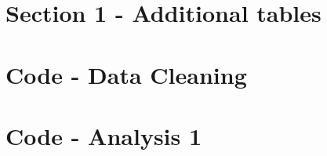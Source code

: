 \documentclass[hidelinks,12pts]{article}
\DeclareMathOperator{\1}{\mathbbm{1}}
\begin{document}
\newpage
\newpage
\begin{appendices}

    \section{Section 1 - Additional tables} \label{sec:BIC_tables}
    

    

    

    

    

    

    \newpage
    \section{Code - Data Cleaning} \label{sec:dta_clean}
        
    \newpage
    \section{Code - Analysis 1}
        

\end{appendices}
\end{document}

